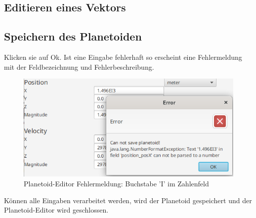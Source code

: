 \subsection{Editieren eines Vektors}


\subsection{Speichern des Planetoiden}
Klicken sie auf Ok.
Ist eine Eingabe fehlerhaft so erscheint eine Fehlermeldung mit der Feldbezeichnung und Fehlerbeschreibung.

\begin{figure}[H]
	\centering
	\includegraphics[width=12cm]{res/planetoidsaveerror.png}
	\caption[Planetoid-Editor Fehlermeldungsbeispiel]{Planetoid-Editor Fehlermeldung: Buchstabe 'I' im Zahlenfeld}
\end{figure}

Können alle Eingaben verarbeitet werden, wird der Planetoid gespeichert und der Planetoid-Editor wird geschlossen.